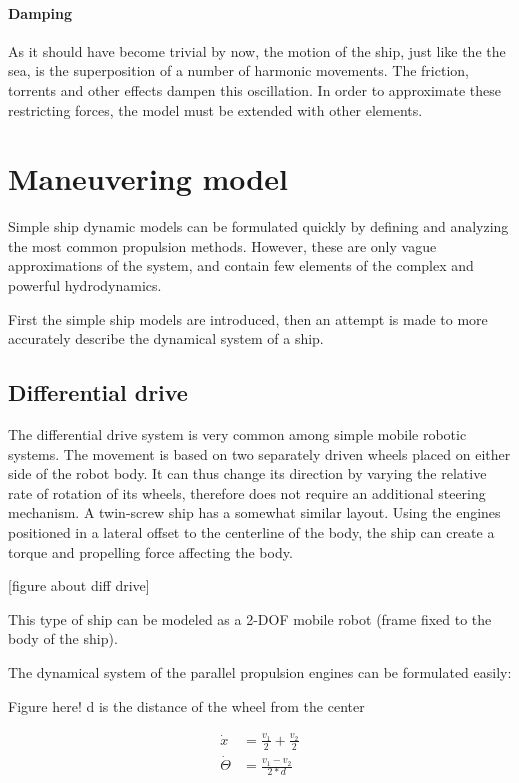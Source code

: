 \paragraph{Damping} As it should have become trivial by now, the motion of the ship, just like the the sea, is the superposition of a number of harmonic movements. The friction, torrents and other effects dampen this oscillation. In order to approximate these restricting forces, the model must be extended with other elements.

\section{Maneuvering model}

Simple ship dynamic models can be formulated quickly by defining and analyzing the most common propulsion methods. However, these are only vague approximations of the system, and contain few elements of the complex and powerful hydrodynamics.

First the simple ship models are introduced, then an attempt is made to more accurately describe the dynamical system of a ship.

\subsection{Differential drive}

The differential drive system is very common among simple mobile robotic systems. The movement is based on two separately driven wheels placed on either side of the robot body. It can thus change its direction by varying the relative rate of rotation of its wheels, therefore does not require an additional steering mechanism. A twin-screw ship has a somewhat similar layout. Using the engines positioned in a lateral offset to the centerline of the body, the ship can create a torque and propelling force affecting the body.

[figure about diff drive]

This type of ship can be modeled as a 2-DOF mobile robot (frame fixed to the body of the ship).

The dynamical system of the parallel propulsion engines can be formulated easily:

Figure here! d is the distance of the wheel from the center

\begin{align}
	\dot{x} &= \frac{v_1}{2} + \frac{v_2}{2} \\
    \dot{\Theta} &= \frac{v_1-v_2}{2*d}
\end{align}

